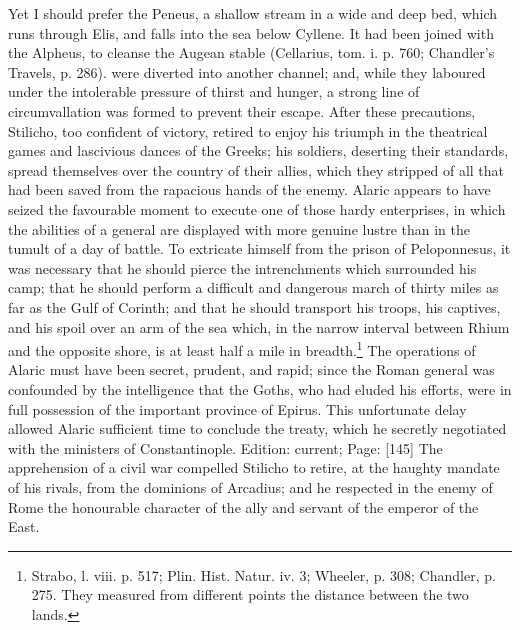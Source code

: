 {Yet I should prefer the Peneus, a shallow stream in a wide and deep bed, which runs through Elis, and falls into the sea below Cyllene. It had been joined with the Alpheus, to cleanse the Augean stable (Cellarius, tom. i. p. 760; Chandler\texthebrew{}’s Travels, p. 286).} were diverted into another channel; and, while they laboured under the intolerable pressure of thirst and hunger, a strong line of circumvallation was formed to prevent their escape. After these precautions, Stilicho, too confident of victory, retired to enjoy his triumph in the theatrical games and lascivious dances of the Greeks; his soldiers, deserting their standards, spread themselves over the country of their allies, which they stripped of all that had been saved from the rapacious hands of the enemy. Alaric appears to have seized the favourable moment to execute one of those hardy enterprises, in which the abilities of a general are displayed with more genuine lustre than in the tumult of a day of battle. To extricate himself from the prison of Peloponnesus, it was necessary that he should pierce the intrenchments which surrounded his camp; that he should perform a difficult and dangerous march of thirty miles as far as the Gulf of Corinth; and that he should transport his troops, his captives, and his spoil over an arm of the sea which, in the narrow interval between Rhium and the opposite shore, is at least half a mile in breadth.\footnote{Strabo, l. viii. p. 517; Plin. Hist. Natur. iv. 3; Wheeler, p. 308; Chandler, p. 275. They measured from different points the distance between the two lands.} The operations of Alaric must have been secret, prudent, and rapid; since the Roman general was confounded by the intelligence that the Goths, who had eluded his efforts, were in full possession of the important province of Epirus. This unfortunate delay allowed Alaric sufficient time to conclude the treaty, which he secretly negotiated with the ministers of Constantinople. Edition: current; Page: [145] The apprehension of a civil war compelled Stilicho to retire, at the haughty mandate of his rivals, from the dominions of Arcadius; and he respected in the enemy of Rome the honourable character of the ally and servant of the emperor of the East.


